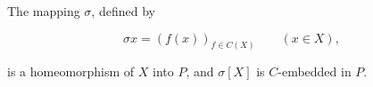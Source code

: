 The mapping $\sigma$, defined by

$$\sigma x = (f(x))_{f \in C(X)} \qquad (x \in X),$$

is a homeomorphism of $X$ into $P$, and $\sigma[X]$ is $C$-embedded in $P$.
